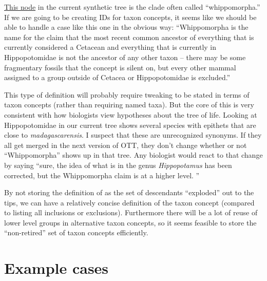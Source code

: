 \documentclass[11pt]{article}
\begin{document}
\href{https://tree.opentreeoflife.org/opentree/opentree4.0@3454690}{This node} in the 
current synthetic tree is the clade often called ``whippomorpha.''
If we are going to be creating IDs for taxon concepts, it seems like we should be
  able to handle a case like this one in the obvious way: 
  ``Whippomorpha is the name for the claim that the most recent common ancestor 
  of everything that is currently considered a Cetacean and everything that is 
  currently in Hippopotomidae is not the ancestor of any other taxon -- there may be some fragmentary fossils that the concept 
  is silent on, but every other mammal assigned to a group outside of Cetacea or Hippopotomidae is excluded.''

This type of definition will probably require tweaking to be stated in terms of taxon concepts (rather than requiring named taxa).
But the core of this is very consistent with how biologists view hypotheses about the 
  tree of life.
Looking at Hippopotomidae in our current tree shows several species with epithets that are close to {\em madagascarensis}.
I suspect that these are unrecognized synonyms.
If they all get merged in the next version of OTT, they don't change whether or not ``Whippomorpha'' shows up in that tree.
Any biologist would react to that change by saying ``sure, the idea of what is in the
genus {\em Hippopotamus} has been corrected, but the Whippomorpha claim is at a higher level.
''

By not storing the definition of as the set of descendants ``exploded'' out to the tips, 
  we can have a relatively concise definition of the taxon concept (compared to listing all
  inclusions or exclusions).
Furthermore there will be a lot of reuse of lower level groups in alternative taxon concepts,
  so it seems feasible to store the ``non-retired'' set of taxon concepts efficiently.
\section{Example cases}
\end{document}
